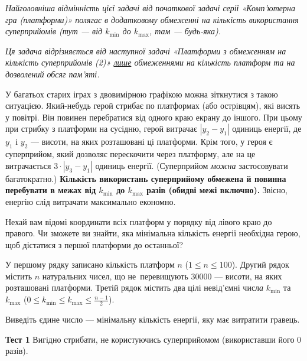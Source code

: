 ﻿{\it Найголовніша відмінність цієї задачі від початкової задачі серії «Комп'ютерна гра (платформи)» полягає в додатковому обмеженні на кількість використання суперприйомів (тут --- від $k_{\min}$ до $k_{\max}$, там --- будь-яка).}

{\it Ця задача відрізняється від наступної задачі «Платформи з обмеженням на кількість суперприйомів (2)» \underline{лише} обмеженнями на кількість платформ та на дозволений обсяг пам'яті.}

  У багатьох старих іграх з двовимірною графікою можна зіткнутися з такою ситуацією. Який-небудь герой стрибає по платформах (або острівцям), 
  які висять у повітрі. Він повинен перебратися від одного краю екрану до іншого. При цьому при стрибку з  платформи на сусідню, 
  герой витрачає $|y_2-y_1|$ одиниць енергії, де $y_1$ і $y_2$ ---
  вис{\it о}ти, на яких розташовані ці платформи. Крім того, у героя є суперприйом, який дозволяє перескочити через платформу, 
  але на це витрачається $3\cdot|y_3-y_1|$ одиниць енергії. (Суперприйом \emph{можна} застосовувати багатократно.) 
  {\bf
  Кількість використань суперприйому обмежена й повинна перебувати в межах від $k_{\min}$ до $k_{\max}$ разів (обидві межі включно).   
  }
  Звісно, енергію слід витрачати максимально економно.
       


	Нехай вам відомі координати всіх платформ у порядку від лівого краю до правого. 
	Чи зможете ви знайти, яка мінімальна кількість енергії необхідна герою, щоб дістатися з першої платформи до останньої?

\InputFile
  У першому рядку записано кількість платформ $n$ ($1\leqslant n\leqslant 100$). Другий рядок містить $n$ натуральних чисел, 
  що не~перевищують 30000 --- вис{\it о}ти, на яких розташовані платформи.
  Третій рядок містить два цілі невід'ємні числ{\it а} $k_{\min}$ та $k_{\max}$ ($0\leqslant k_{\min}\leqslant k_{\max}\leqslant \frac{n-1}{2}$). 

\OutputFile
  Виведіть єдине число --- мінімальну кількість енергії, яку має витратити гравець.

\Examples
\begin{example}
\end{example}

\Note

{\bf Тест 1} Вигідно стрибати, не користуючись суперприйомом (використавши його 0 разів).

